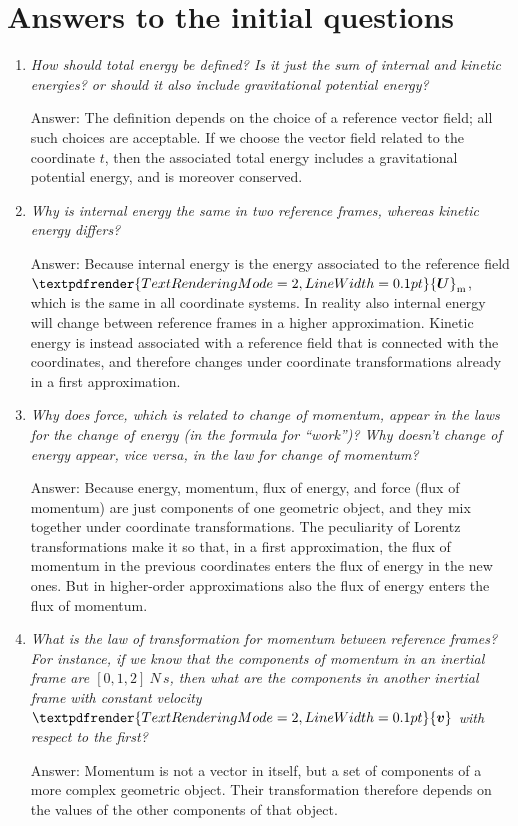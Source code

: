 \documentclass[\ifafour a4paper,12pt,\else a5paper,10pt,\fi%
onecolumn,oneside,article,%
british%
]{memoir}
\renewcommand*{\bm}[1]{\textpdfrender{TextRenderingMode=2,LineWidth=0.1pt}{\boldsymbol{#1}}}
\renewcommand*{\|}[1][]{\nonscript\:#1\vert\nonscript\:\mathopen{}}
\newcommand*{\yU}{\bm{U}}
\newcommand*{\yUm}{\yU_{\textrm{m}}}
\begin{document}
\section{Answers to the initial questions}
\label{sec:answers}

\begin{enumerate}[itemsep=1ex]
\item \emph{How should \emph{total energy} be defined? Is it just the sum of internal and kinetic energies? or should it also include gravitational potential energy?}

  Answer: The definition depends on the choice of a reference vector field; all such choices are acceptable. If we choose the vector field related to the coordinate $t$, then the associated total energy includes a gravitational potential energy, and is moreover conserved.


\item \emph{Why is \emph{internal energy} the same in two reference frames, whereas \emph{kinetic energy} differs?}

Answer: Because internal energy is the energy associated to the reference field $\yUm$, which is  the same in all coordinate systems. In reality also internal energy will change between reference frames in a higher approximation. Kinetic energy is instead associated with a reference field that is connected with the coordinates, and therefore changes under coordinate transformations already in a first approximation.


\item \emph{Why does force, which is related to change of momentum, appear in the laws for the change of energy (in the formula for \enquote{work})? Why doesn't change of energy appear, vice versa, in the law for change of momentum?}

  Answer: Because energy, momentum, flux of energy, and force (flux of momentum) are just components of one geometric object, and they mix together under coordinate transformations. The peculiarity of Lorentz transformations make it so that, in a first approximation, the flux of momentum in the previous coordinates enters the flux of energy in the new ones. But in higher-order approximations also the flux of energy enters the flux of momentum.


\item \emph{What is the \emph{law of transformation for momentum} between reference frames? For instance, if we know that the components of momentum in an inertial frame are $[0,1,2]\:\unit{N\,s}$, then what are the components in another inertial frame with constant velocity $\bm{v}$ with respect to the first?}

Answer: Momentum is not a vector in itself, but a set of components of a more complex geometric object. Their transformation therefore depends on the values of the other components of that object.
\end{enumerate}
\end{document}
